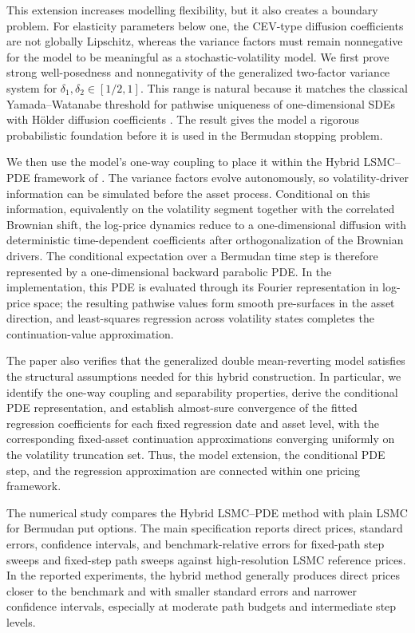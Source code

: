 \documentclass[10pt]{article}
\theoremstyle{plain}
\theoremstyle{definition}
\theoremstyle{remark}
\begin{document}
This extension increases modelling flexibility, but it also creates a boundary problem. For elasticity parameters below one, the CEV-type diffusion coefficients are not globally Lipschitz, whereas the variance factors must remain nonnegative for the model to be meaningful as a stochastic-volatility model. We first prove strong well-posedness and nonnegativity of the generalized two-factor variance system for $\delta_1,\delta_2\in[1/2,1]$. This range is natural because it matches the classical Yamada--Watanabe threshold for pathwise uniqueness of one-dimensional SDEs with H\"older diffusion coefficients \citep{yamada1971uniqueness}. The result gives the model a rigorous probabilistic foundation before it is used in the Bermudan stopping problem.

We then use the model's one-way coupling to place it within the Hybrid LSMC--PDE framework of \cite{farahany2020mixing}. The variance factors evolve autonomously, so volatility-driver information can be simulated before the asset process. Conditional on this information, equivalently on the volatility segment together with the correlated Brownian shift, the log-price dynamics reduce to a one-dimensional diffusion with deterministic time-dependent coefficients after orthogonalization of the Brownian drivers. The conditional expectation over a Bermudan time step is therefore represented by a one-dimensional backward parabolic PDE. In the implementation, this PDE is evaluated through its Fourier representation in log-price space; the resulting pathwise values form smooth pre-surfaces in the asset direction, and least-squares regression across volatility states completes the continuation-value approximation.

The paper also verifies that the generalized double mean-reverting model satisfies the structural assumptions needed for this hybrid construction. In particular, we identify the one-way coupling and separability properties, derive the conditional PDE representation, and establish almost-sure convergence of the fitted regression coefficients for each fixed regression date and asset level, with the corresponding fixed-asset continuation approximations converging uniformly on the volatility truncation set. Thus, the model extension, the conditional PDE step, and the regression approximation are connected within one pricing framework.

The numerical study compares the Hybrid LSMC--PDE method with plain LSMC for Bermudan put options. The main specification reports direct prices, standard errors, confidence intervals, and benchmark-relative errors for fixed-path step sweeps and fixed-step path sweeps against high-resolution LSMC reference prices. In the reported experiments, the hybrid method generally produces direct prices closer to the benchmark and with smaller standard errors and narrower confidence intervals, especially at moderate path budgets and intermediate step levels.
\end{document}
